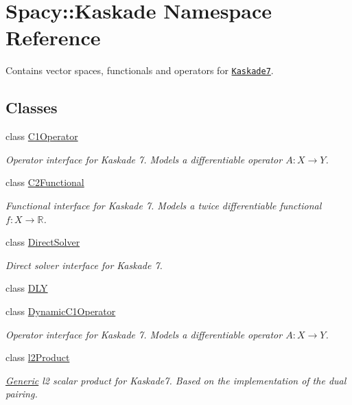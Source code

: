 \hypertarget{namespaceSpacy_1_1Kaskade}{\section{Spacy\-:\-:Kaskade Namespace Reference}
\label{namespaceSpacy_1_1Kaskade}
}


Contains vector spaces, functionals and operators for \href{http://www.zib.de/projects/kaskade7-finite-element-toolbox}{\tt Kaskade7}.  


\subsection*{Classes}
\begin{DoxyCompactItemize}
\item 
class \hyperlink{classSpacy_1_1Kaskade_1_1C1Operator}{C1\-Operator}
\begin{DoxyCompactList}\small\item\em Operator interface for Kaskade 7. Models a differentiable operator $A:X\rightarrow Y$. \end{DoxyCompactList}\item 
class \hyperlink{classSpacy_1_1Kaskade_1_1C2Functional}{C2\-Functional}
\begin{DoxyCompactList}\small\item\em Functional interface for Kaskade 7. Models a twice differentiable functional $f:X\rightarrow \mathbb{R}$. \end{DoxyCompactList}\item 
class \hyperlink{classSpacy_1_1Kaskade_1_1DirectSolver}{Direct\-Solver}
\begin{DoxyCompactList}\small\item\em Direct solver interface for Kaskade 7. \end{DoxyCompactList}\item 
class \hyperlink{classSpacy_1_1Kaskade_1_1DLY}{D\-L\-Y}
\item 
class \hyperlink{classSpacy_1_1Kaskade_1_1DynamicC1Operator}{Dynamic\-C1\-Operator}
\begin{DoxyCompactList}\small\item\em Operator interface for Kaskade 7. Models a differentiable operator $A:X\rightarrow Y$. \end{DoxyCompactList}\item 
class \hyperlink{classSpacy_1_1Kaskade_1_1l2Product}{l2\-Product}
\begin{DoxyCompactList}\small\item\em \hyperlink{namespaceSpacy_1_1Generic}{Generic} l2 scalar product for Kaskade7. Based on the implementation of the dual pairing. \end{DoxyCompactList}\item 

\end{DoxyCompactItemize}
